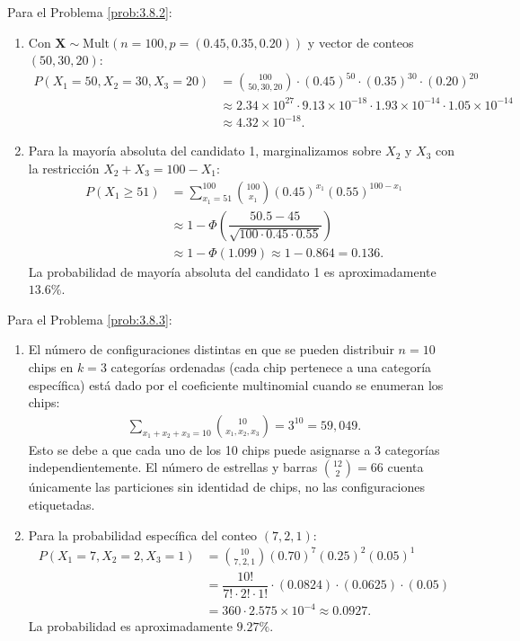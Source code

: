 \begin{solucion}
	\label{sol:3.8.2}
	Para el Problema \ref{prob:3.8.2}:
	\begin{enumerate}
		\item Con $\bm{X} \sim \text{Mult}(n = 100, p = (0.45, 0.35, 0.20))$ y vector de conteos $(50, 30, 20)$:
		\begin{align*}
			P(X_{1} = 50, X_{2} = 30, X_{3} = 20) &= \binom{100}{50, 30, 20} \cdot (0.45)^{50} \cdot (0.35)^{30} \cdot (0.20)^{20} \\
			&\approx 2.34 \times 10^{27} \cdot 9.13 \times 10^{-18} \cdot 1.93 \times 10^{-14} \cdot 1.05 \times 10^{-14} \\
			&\approx 4.32 \times 10^{-18}.
		\end{align*}
		\item Para la mayoría absoluta del candidato 1, marginalizamos sobre $X_{2}$ y $X_{3}$ con la restricción $X_{2} + X_{3} = 100 - X_{1}$:
		\begin{align*}
			P(X_{1} \ge 51) &= \sum_{x_{1}=51}^{100} \binom{100}{x_{1}} (0.45)^{x_{1}} (0.55)^{100-x_{1}} \\
			&\approx 1 - \Phi\left(\dfrac{50.5 - 45}{\sqrt{100 \cdot 0.45 \cdot 0.55}}\right) \\
			&\approx 1 - \Phi(1.099) \approx 1 - 0.864 = 0.136.
		\end{align*}
		La probabilidad de mayoría absoluta del candidato 1 es aproximadamente $13.6\%$.
	\end{enumerate}
\end{solucion}

\begin{solucion}
	\label{sol:3.8.3}
	Para el Problema \ref{prob:3.8.3}:
	\begin{enumerate}
		\item El número de configuraciones distintas en que se pueden distribuir $n = 10$ chips en $k = 3$ categorías ordenadas (cada chip pertenece a una categoría específica) está dado por el coeficiente multinomial cuando se enumeran los chips:
		\begin{align*}
			\sum_{x_{1}+x_{2}+x_{3}=10} \binom{10}{x_{1}, x_{2}, x_{3}} = 3^{10} = 59{,}049.
		\end{align*}
		Esto se debe a que cada uno de los 10 chips puede asignarse a 3 categorías independientemente. El número de estrellas y barras $\binom{12}{2} = 66$ cuenta únicamente las particiones sin identidad de chips, no las configuraciones etiquetadas.
		\item Para la probabilidad específica del conteo $(7, 2, 1)$:
		\begin{align*}
			P(X_{1} = 7, X_{2} = 2, X_{3} = 1) &= \binom{10}{7, 2, 1} (0.70)^{7} (0.25)^{2} (0.05)^{1} \\
			&= \dfrac{10!}{7! \cdot 2! \cdot 1!} \cdot (0.0824) \cdot (0.0625) \cdot (0.05) \\
			&= 360 \cdot 2.575 \times 10^{-4} \approx 0.0927.
		\end{align*}
		La probabilidad es aproximadamente $9.27\%$.
	\end{enumerate}
\end{solucion}

